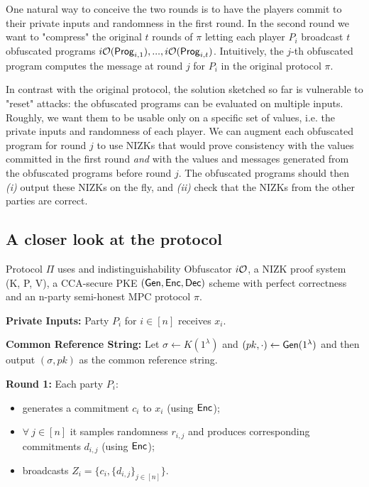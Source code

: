 One natural way to conceive the two rounds is to have the players commit to their private inputs and randomness in the first round.
In the second round we want to "compress" the original $t$ rounds of $\pi$ letting each player $P_i$ broadcast $t$ obfuscated programs
$i\mathcal{O}(\mathsf{Prog}_{i,1}),...,i\mathcal{O}(\mathsf{Prog}_{i,t})$. Intuitively, the $j$-th obfuscated program computes the message at round $j$ for $P_i$ in the original protocol $\pi$.

In contrast with the original protocol, the solution sketched so far is vulnerable to "reset" attacks: the obfuscated programs can be evaluated on multiple inputs. Roughly, we want them to be usable only on a specific set of values, i.e. the private inputs and randomness of each player.
We can augment each obfuscated program for round $j$ to use NIZKs that would prove consistency with the values committed in the first round \emph{and} with the values and messages generated from the obfuscated programs before round $j$. The obfuscated programs should then \emph{(i)} output these NIZKs on the fly, and \emph{(ii)} check that the NIZKs from the other parties are correct.

\subsection{A closer look at the protocol}
Protocol $\Pi$ uses and indistinguishability Obfuscator $i\mathcal{O}$, a NIZK proof system (K, P, V), a CCA-secure PKE
$(\mathsf{Gen}, \mathsf{Enc}, \mathsf{Dec})$
scheme with perfect correctness and an n-party semi-honest MPC protocol $\pi$.

\noindent
\textbf{Private Inputs:} Party $P_i$ for $i \in [n]$ receives $x_i$.

\noindent
\textbf{Common Reference String:} Let $\sigma \gets K(1^{\lambda})$ and $(pk, \cdot) \gets \mathsf{Gen}(1^{\lambda})$ and then output $(\sigma, pk)$ as the common reference string.

\noindent
\textbf{Round 1:} Each party $P_i$:
\begin{itemize}
	\item generates a commitment $c_i$ to $x_i$ (using $\mathsf{Enc}$);
	\item $\forall\ j \in [n]$ it samples randomness $r_{i,j}$ and produces corresponding commitments $d_{i,j}$ (using $\mathsf{Enc}$);
	\item broadcasts $Z_i = \{c_i, \{ d_{i,j} \}_{j \in [n]}  \}$.
\end{itemize}


